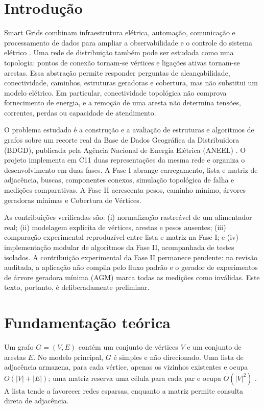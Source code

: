 \documentclass[12pt]{article}
\begin{document}
\section{Introdução}

Smart Grids combinam infraestrutura elétrica, automação, comunicação e processamento de dados para ampliar a observabilidade e o controle do sistema elétrico \cite{gungor2011}. Uma rede de distribuição também pode ser estudada como uma topologia: pontos de conexão tornam-se vértices e ligações ativas tornam-se arestas. Essa abstração permite responder perguntas de alcançabilidade, conectividade, caminhos, estruturas geradoras e cobertura, mas não substitui um modelo elétrico. Em particular, conectividade topológica não comprova fornecimento de energia, e a remoção de uma aresta não determina tensões, correntes, perdas ou capacidade de atendimento.

O problema estudado é a construção e a avaliação de estruturas e algoritmos de grafos sobre um recorte real da Base de Dados Geográfica da Distribuidora (BDGD), publicada pela Agência Nacional de Energia Elétrica (ANEEL) \cite{aneelbdgd}. O projeto implementa em C11 duas representações da mesma rede e organiza o desenvolvimento em duas fases. A Fase I abrange carregamento, lista e matriz de adjacência, buscas, componentes conexos, simulação topológica de falha e medições comparativas. A Fase II acrescenta pesos, caminho mínimo, árvores geradoras mínimas e Cobertura de Vértices.

As contribuições verificadas são: (i) normalização rastreável de um alimentador real; (ii) modelagem explícita de vértices, arestas e pesos ausentes; (iii) comparação experimental reproduzível entre lista e matriz na Fase I; e (iv) implementação modular de algoritmos da Fase II, acompanhada de testes isolados. A contribuição experimental da Fase II permanece pendente: na revisão auditada, a aplicação não compila pelo fluxo padrão e o gerador de experimentos de árvore geradora mínima (AGM) marca todas as medições como inválidas. Este texto, portanto, é deliberadamente preliminar.

\section{Fundamentação teórica}

Um grafo $G=(V,E)$ contém um conjunto de vértices $V$ e um conjunto de arestas $E$. No modelo principal, $G$ é simples e não direcionado. Uma lista de adjacência armazena, para cada vértice, apenas os vizinhos existentes e ocupa $O(|V|+|E|)$; uma matriz reserva uma célula para cada par e ocupa $O(|V|^2)$ \cite{cormen2022}. A lista tende a favorecer redes esparsas, enquanto a matriz permite consulta direta de adjacência.
\end{document}
